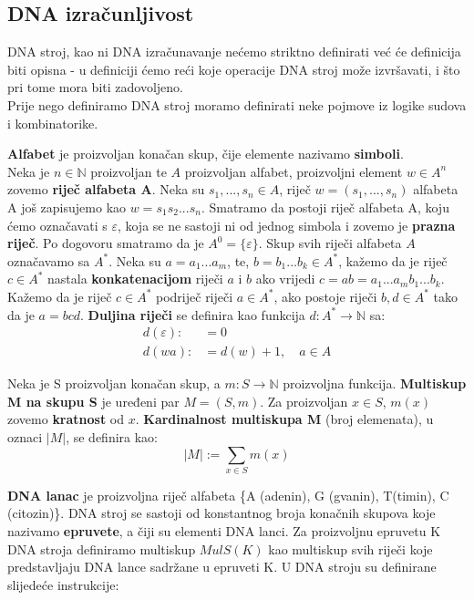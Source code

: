 \documentclass[12pt, a4paper]{book}
\begin{document}
\begin{spacing}{1.5}
\section{DNA izračunljivost}
\label{sec:DNAizr}
DNA stroj, kao ni DNA izračunavanje nećemo striktno definirati već će definicija biti opisna - u definiciji ćemo reći koje operacije DNA stroj može izvršavati, i što pri tome mora biti zadovoljeno.\\ Prije nego definiramo DNA stroj moramo definirati neke pojmove iz logike sudova i kombinatorike.
\begin{defn}
\textbf{Alfabet} je proizvoljan konačan skup, čije elemente nazivamo \textbf{simboli}.\\
Neka je $n \in \mathbb{N}$ proizvoljan te $A$ proizvoljan alfabet, proizvoljni element $w \in A^n$ zovemo \textbf{riječ alfabeta A}. Neka su $s_1,..., s_n \in A$, riječ $w=(s_1,...,s_n)$ alfabeta A još zapisujemo kao $w=s_1s_2...s_n$. Smatramo da postoji riječ alfabeta A, koju ćemo označavati s $\varepsilon$, koja se ne sastoji ni od jednog simbola i zovemo je \textbf{prazna riječ}. Po dogovoru smatramo da je $A^0=\{\varepsilon\}$. Skup svih riječi alfabeta $A$ označavamo sa $A^*$. Neka su $a=a_1...a_m$, te, $b=b_1...b_k \in A^*$, kažemo da je riječ $c \in A^*$ nastala \textbf{konkatenacijom} riječi $a$ i $b$ ako vrijedi $c=ab=a_1...a_mb_1...b_k$. Kažemo da je riječ $c \in A^*$ podriječ riječi $a \in A^*$, ako postoje riječi $b, d \in A^*$ tako da je $a=bcd$. \textbf{Duljina riječi} se definira kao funkcija $d:A^*\to \mathbb{N}$ sa:
\begin{align*}
	d(\varepsilon) :&= 0 \\
	d(wa) :&= d(w)+1, \quad a \in A
\end{align*}
\end{defn}
\begin{defn}
Neka je S proizvoljan konačan skup, a $m:S \to \mathbb{N}$ proizvoljna funkcija. \textbf{Multiskup M na skupu S} je uređeni par $M=(S,m)$. Za proizvoljan $x\in S$, $m(x)$ zovemo \textbf{kratnost} od $x$. \textbf{Kardinalnost multiskupa M} (broj elemenata), u oznaci $|M|$, se definira kao:
\[|M|:=\sum_{x \in S} m(x)\]
\end{defn}
\begin{defn}
 \textbf{DNA lanac} je proizvoljna riječ alfabeta \{A (adenin), G (gvanin), T(timin), C (citozin)\}. DNA stroj se sastoji od konstantnog broja konačnih skupova koje nazivamo \textbf{epruvete}, a čiji su elementi DNA lanci. Za proizvoljnu epruvetu K DNA stroja definiramo multiskup $MulS(K)$ kao multiskup svih riječi koje predstavljaju DNA lance sadržane u epruveti K. U DNA stroju su definirane slijedeće instrukcije:

\end{defn}
\end{spacing}
\end{document}
